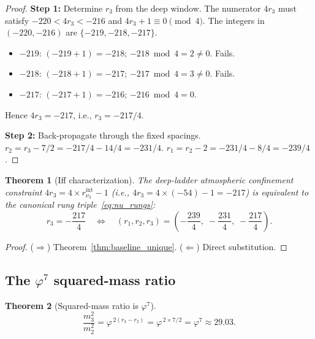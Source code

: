 \documentclass[11pt,a4paper]{article}
\newtheorem{theorem}{Theorem}[section]
\theoremstyle{definition}
\theoremstyle{remark}
\newcommand{\phig}{\varphi}
\begin{document}
\begin{proof}
\textbf{Step 1:} Determine $r_3$ from the deep window.
The numerator $4r_3$ must satisfy $-220 < 4r_3 < -216$ and
$4r_3 + 1 \equiv 0 \pmod{4}$.  The integers in $(-220, -216)$ are
$\{-219, -218, -217\}$.
\begin{itemize}[nosep]
  \item $-219$: $(-219 + 1) = -218$;\; $-218 \bmod 4 = 2 \neq 0$. \quad Fails.
  \item $-218$: $(-218 + 1) = -217$;\; $-217 \bmod 4 = 3 \neq 0$. \quad Fails.
  \item $-217$: $(-217 + 1) = -216$;\; $-216 \bmod 4 = 0$. \quad \checkmark
\end{itemize}
Hence $4r_3 = -217$, i.e., $r_3 = -217/4$.

\textbf{Step 2:} Back-propagate through the fixed spacings.
$r_2 = r_3 - 7/2 = -217/4 - 14/4 = -231/4$.
$r_1 = r_2 - 2 = -231/4 - 8/4 = -239/4$.
\end{proof}

\begin{theorem}[Iff characterization]
\label{thm:nu_iff}
The deep-ladder atmospheric confinement constraint $4r_3 = 4 \times
r_{\nu_3}^{\mathrm{int}} - 1$ (i.e., $4r_3 = 4 \times (-54) - 1 = -217$)
is equivalent to the canonical rung triple~\eqref{eq:nu_rungs}:
\begin{equation}
  r_3 = -\frac{217}{4}
  \quad\Longleftrightarrow\quad
  (r_1, r_2, r_3) = \left(-\frac{239}{4},\; -\frac{231}{4},\;
  -\frac{217}{4}\right).
  \label{eq:nu_iff}
\end{equation}
\end{theorem}

\begin{proof}
($\Rightarrow$) Theorem~\ref{thm:baseline_unique}.
($\Leftarrow$) Direct substitution.
\end{proof}

\subsection{The $\phig^7$ squared-mass ratio}

\begin{theorem}[Squared-mass ratio is $\phig^7$]
\label{thm:phi7}
\begin{equation}
  \boxed{\frac{m_3^2}{m_2^2}
    = \phig^{\,2(r_3 - r_2)}
    = \phig^{\,2 \times 7/2}
    = \phig^7
    \approx 29.03.}
  \label{eq:phi7}
\end{equation}
\end{theorem}
\end{document}
